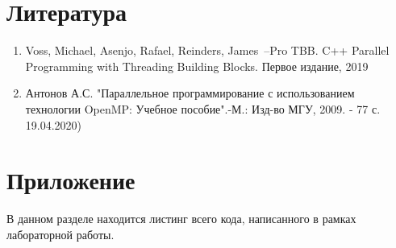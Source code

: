 \documentclass{report}
\begin{document}
\newpage
\section{Литература}
\begin{enumerate}
\item Voss, Michael, Asenjo, Rafael, Reinders, James~--Pro TBB. C++ Parallel Programming with Threading Building Blocks. Первое издание, 2019
\item Антонов А.С. "Параллельное программирование с использованием технологии OpenMP: Учебное пособие".-М.: Изд-во МГУ, 2009. - 77 с. 19.04.2020)
\end{enumerate}



\newpage
\section*{Приложение}
В данном разделе находится листинг всего кода, написанного в рамках лабораторной работы.
















\end{document}
